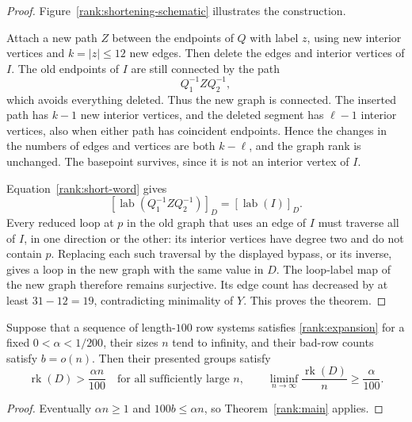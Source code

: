 \begin{proof}
Figure~\ref{rank:shortening-schematic} illustrates the construction.



Attach a new path $Z$ between the endpoints of $Q$ with label $z$,
using new interior vertices and $k=|z|\le12$ new edges.  Then delete
the edges and interior vertices of $I$.  The old endpoints of $I$
are still connected by the path
\[
 Q_1^{-1} Z Q_2^{-1},
\]
which avoids everything deleted.  Thus the new graph is connected.
The inserted path has $k-1$ new interior vertices, and the deleted
segment has $\ell-1$ interior vertices, also when either path has
coincident endpoints.  Hence the changes in the numbers of edges
and vertices are both $k-\ell$, and the graph rank is unchanged.
The basepoint survives, since it is not an interior vertex of $I$.

Equation~\eqref{rank:short-word} gives
\[
 [\operatorname{lab}(Q_1^{-1}ZQ_2^{-1})]_D
   =[\operatorname{lab}(I)]_D.
\]
Every reduced loop at $p$ in the old graph that uses an edge of $I$
must traverse all of $I$, in one direction or the other: its interior
vertices have degree two and do not contain $p$.  Replacing each
such traversal by the displayed bypass, or its inverse, gives a loop
in the new graph with the same value in $D$.  The loop-label map of
the new graph therefore remains surjective.  Its edge count has
decreased by at least $31-12=19$, contradicting minimality of $Y$.
This proves the theorem.
\end{proof}

\begin{corollary}\label{rank:asymptotic}
Suppose that a sequence of length-$100$ row systems satisfies
\eqref{rank:expansion} for a fixed $0<\alpha<1/200$, their sizes
$n$ tend to infinity, and their bad-row counts satisfy $b=o(n)$.
Then their presented groups satisfy
\[
 \operatorname{rk}(D)>\frac{\alpha n}{100}
 \quad\text{for all sufficiently large }n,
 \qquad
 \liminf_{n\to\infty}\frac{\operatorname{rk}(D)}n
 \ge\frac\alpha{100}.
\]
\end{corollary}
\begin{proof}
Eventually $\alpha n\ge1$ and $100b\le\alpha n$, so
Theorem~\ref{rank:main} applies.
\end{proof}
